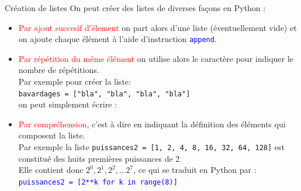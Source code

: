 \documentclass[10pt]{beamer}
\begin{document}
\begin{frame}
	\mframe{\Python}
	\begin{alertblock}{Création de listes}
		On peut créer des listes de diverses façons en Python :
		\begin{itemize}
			\item<2-> \textcolor{red}{Par ajout succesif d'élement} on part alors d'une liste (éventuellement vide) et on ajoute chaque élément à l'aide d'instruction \textcolor{blue}{\tt append}.
			\item<3-> \textcolor{red}{Par répétition du même élément} on utilise alors le caractère \textcolor{blue}{\tt *} pour indiquer le nombre de répétitions. \\
			      \onslide<4-> {Par exemple pour créer la liste: \\ {\tt bavardages = ["bla", "bla", "bla", "bla"]} \\ on peut simplement écrire : \\}
			      \onslide<5->{\textcolor{blue}{\tt bavardages = ["bla"]*4}}
			\item<6->	 \textcolor{red}{Par compréhension}, c'est à dire en indiquant la définition des éléments qui composent la liste. \\
			      \onslide<7-> {Par exemple la liste {\tt puissances2 = [1, 2, 4, 8, 16, 32, 64, 128]} est constitué des huits premières puissances de 2} \\
			      \onslide<8-> {Elle contient donc $2^0, 2^1, 2^2, \dots 2^7$, ce qui se traduit en Python par :}\\
			      \onslide<9-> \textcolor{blue}{\tt puissances2 = [2**k for k in range(8)]}
		\end{itemize}
	\end{alertblock}
\end{frame}
\end{document}
